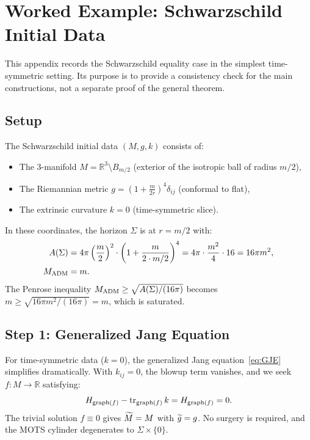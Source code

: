 \section{Worked Example: Schwarzschild Initial Data}
\label{app:Schwarzschild}

This appendix records the Schwarzschild equality case in the simplest time-symmetric setting. Its purpose is to provide a consistency check for the main constructions, not a separate proof of the general theorem.

\subsection{Setup}
The Schwarzschild initial data $(M, g, k)$ consists of:
\begin{itemize}
    \item The 3-manifold $M = \mathbb{R}^3 \setminus B_{m/2}$ (exterior of the isotropic ball of radius $m/2$),
    \item The Riemannian metric $g = \left(1 + \frac{m}{2r}\right)^4 \delta_{ij}$ (conformal to flat),
    \item The extrinsic curvature $k = 0$ (time-symmetric slice).
\end{itemize}

In these coordinates, the horizon $\Sigma$ is at $r = m/2$ with:
\begin{align}
    A(\Sigma) &= 4\pi \left(\frac{m}{2}\right)^2 \cdot \left(1 + \frac{m}{2 \cdot m/2}\right)^4 = 4\pi \cdot \frac{m^2}{4} \cdot 16 = 16\pi m^2, \\
    M_{\mathrm{ADM}} &= m.
\end{align}
The Penrose inequality $M_{\mathrm{ADM}} \ge \sqrt{A(\Sigma)/(16\pi)}$ becomes $m \ge \sqrt{16\pi m^2/(16\pi)} = m$, which is saturated.

\subsection{Step 1: Generalized Jang Equation}
For time-symmetric data ($k = 0$), the generalized Jang equation~\eqref{eq:GJE} simplifies dramatically. With $k_{ij} = 0$, the blowup term vanishes, and we seek $f: M \to \mathbb{R}$ satisfying:
\begin{equation}
    H_{\text{graph}(f)} - \operatorname{tr}_{\text{graph}(f)} k = H_{\text{graph}(f)} = 0.
\end{equation}
The trivial solution $f \equiv 0$ gives $\widetilde{M} = M$ with $\widetilde{g} = g$. No surgery is required, and the MOTS cylinder degenerates to $\Sigma \times \{0\}$.

